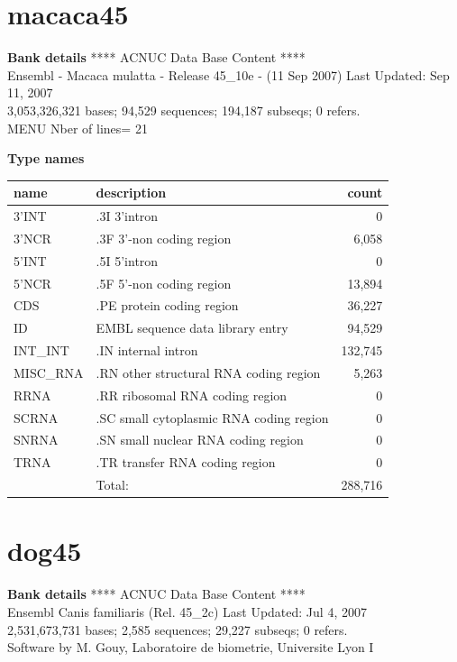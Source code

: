 \documentclass{article}
\begin{document}
\begin{Schunk}
\section{ macaca45 }
\textbf{Bank details}
             ****     ACNUC Data Base Content      ****                         \\
Ensembl - Macaca mulatta - Release 45\_10e - (11 Sep 2007) Last Updated: Sep 11, 2007\\
3,053,326,321 bases; 94,529 sequences; 194,187 subseqs; 0 refers.\\
MENU Nber of lines= 21                                                         

\textbf{Type names}
\noindent\begin{tabular}{llr}
\hline \hline
name & description & count \\
\hline
3'INT  &  .3I 3'intron  &  0 \\
3'NCR  &  .3F  3'-non coding region  &  6,058 \\
5'INT  &  .5I 5'intron  &  0 \\
5'NCR  &  .5F  5'-non coding region  &  13,894 \\
CDS  &  .PE protein coding region  &  36,227 \\
ID  &  EMBL sequence data library entry  &  94,529 \\
INT\_INT  &  .IN  internal intron  &  132,745 \\
MISC\_RNA  &  .RN other structural RNA coding region  &  5,263 \\
RRNA  &  .RR ribosomal RNA coding region  &  0 \\
SCRNA  &  .SC small cytoplasmic RNA coding region  &  0 \\
SNRNA  &  .SN small nuclear RNA coding region  &  0 \\
TRNA  &  .TR transfer RNA coding region  &  0 \\
\hline
 & Total: & 288,716 \\
\hline \hline
\end{tabular}

\section{ dog45 }
\textbf{Bank details}
             ****     ACNUC Data Base Content      ****                         \\
       Ensembl Canis familiaris  (Rel. 45\_2c) Last Updated: Jul  4, 2007\\
2,531,673,731 bases; 2,585 sequences; 29,227 subseqs; 0 refers.\\
Software by M. Gouy, Laboratoire de biometrie, Universite Lyon I 


\end{Schunk}
\end{document}
